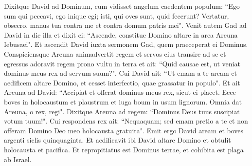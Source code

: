 \begin{biblechapter}
\verse Dixitque David ad Dominum, cum vidisset angelum caedentem populum: “Ego sum qui peccavi, ego inique egi; isti, qui oves sunt, quid fecerunt? Vertatur, obsecro, manus tua contra me et contra domum patris mei". 
\verse Venit autem Gad ad David in die illa et dixit ei: “Ascende, constitue Domino altare in area Areuna Iebusaei". 
\verse Et ascendit David iuxta sermonem Gad, quem praeceperat ei Dominus. 
\verse Conspiciensque Areuna animadvertit regem et servos eius transire ad se 
\verse et egressus adoravit regem prono vultu in terra et ait: “Quid causae est, ut veniat dominus meus rex ad servum suum?". Cui David ait: “Ut emam a te aream et aedificem altare Domino, et cesset interfectio, quae grassatur in populo". 
\verse Et ait Areuna ad David: “Accipiat et offerat dominus meus rex, sicut ei placet. Ecce boves in holocaustum et plaustrum et iuga boum in usum lignorum. 
\verse Omnia dat Areuna, o rex, regi". Dixitque Areuna ad regem: “Dominus Deus tuus suscipiat votum tuum!". 
\verse Cui respondens rex ait: “Nequaquam; sed emam pretio a te et non offeram Domino Deo meo holocausta gratuita". Emit ergo David aream et boves argenti siclis quinquaginta. 
\verse Et aedificavit ibi David altare Domino et obtulit holocausta et pacifica. Et repropitiatus est Dominus terrae, et cohibita est plaga ab Israel.
\end{biblechapter}
